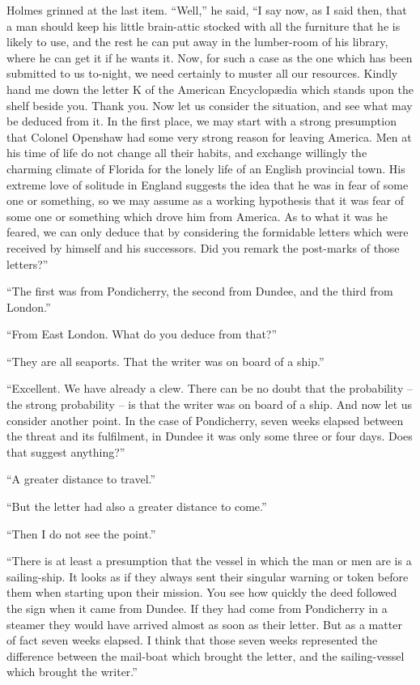 Holmes grinned at the last item. “Well,” he said, “I say
now, as I said then, that a man should keep his little brain-attic
stocked with all the furniture that he is likely to use, and
the rest he can put away in the lumber-room of his library,
where he can get it if he wants it. Now, for such a case as
the one which has been submitted to us to-night, we need certainly
to muster all our resources. Kindly hand me down the
letter K of the American Encyclopædia which stands upon
the shelf beside you. Thank you. Now let us consider the
situation, and see what may be deduced from it. In the first
place, we may start with a strong presumption that Colonel
Openshaw had some very strong reason for leaving America.
Men at his time of life do not change all their habits, and
exchange willingly the charming climate of Florida for the lonely
life of an English provincial town. His extreme love of solitude
in England suggests the idea that he was in fear of some
one or something, so we may assume as a working hypothesis
that it was fear of some one or something which drove him
from America. As to what it was he feared, we can only deduce
that by considering the formidable letters which were
received by himself and his successors. Did you remark the
post-marks of those letters?”

“The first was from Pondicherry, the second from Dundee,
and the third from London.”

“From East London. What do you deduce from that?”

“They are all seaports. That the writer was on board of
a ship.”

“Excellent. We have already a clew. There can be no
doubt that the probability -- the strong probability -- is that the
writer was on board of a ship. And now let us consider another
point. In the case of Pondicherry, seven weeks elapsed
between the threat and its fulfilment, in Dundee it was only
some three or four days. Does that suggest anything?”

“A greater distance to travel.”

“But the letter had also a greater distance to come.”

“Then I do not see the point.”

“There is at least a presumption that the vessel in which
the man or men are is a sailing-ship. It looks as if they always
sent their singular warning or token before them when
starting upon their mission. You see how quickly the deed
followed the sign when it came from Dundee. If they had
come from Pondicherry in a steamer they would have arrived
almost as soon as their letter. But as a matter of fact seven
weeks elapsed. I think that those seven weeks represented
the difference between the mail-boat which brought the letter,
and the sailing-vessel which brought the writer.”

